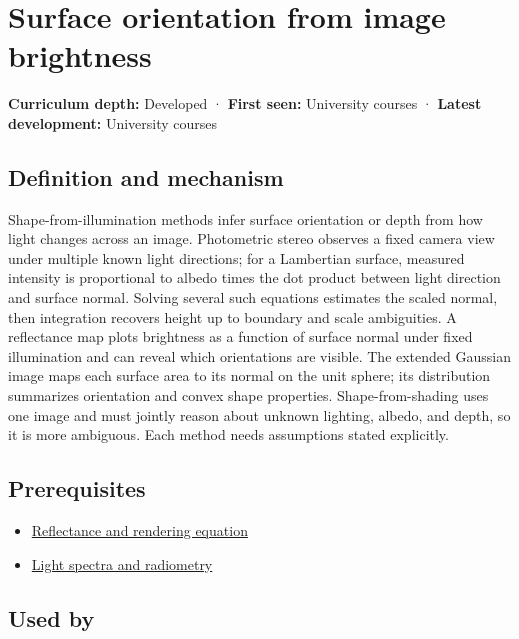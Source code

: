 \hypertarget{appendix-89b2d5b7c9e1}{}
\section{Surface orientation from image brightness}\label{appendix-89b2d5b7c9e1-surface-orientation-from-image-brightness}

\textbf{Curriculum depth:} Developed · \textbf{First seen:} University courses · \textbf{Latest development:} University courses

\subsection{Definition and mechanism}\label{appendix-89b2d5b7c9e1-definition-and-mechanism}

Shape-from-illumination methods infer surface orientation or depth from how light changes across an image. Photometric stereo observes a fixed camera view under multiple known light directions; for a Lambertian surface, measured intensity is proportional to albedo times the dot product between light direction and surface normal. Solving several such equations estimates the scaled normal, then integration recovers height up to boundary and scale ambiguities. A reflectance map plots brightness as a function of surface normal under fixed illumination and can reveal which orientations are visible. The extended Gaussian image maps each surface area to its normal on the unit sphere; its distribution summarizes orientation and convex shape properties. Shape-from-shading uses one image and must jointly reason about unknown lighting, albedo, and depth, so it is more ambiguous. Each method needs assumptions stated explicitly.

\subsection{Prerequisites}\label{appendix-89b2d5b7c9e1-prerequisites}

\begin{itemize}
\tightlist
\item
  \hyperref[appendix-96da0b153b77]{Reflectance and rendering equation}
\item
  \hyperref[appendix-215c2570199b]{Light spectra and radiometry}
\end{itemize}

\subsection{Used by}\label{appendix-89b2d5b7c9e1-used-by}

